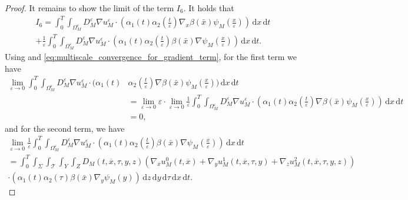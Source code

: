 \documentclass[10pt,a4paper]{amsart}
\def\T{\mathcal{T}}
\newcommand{\di}[1]{\,\mathrm{d}#1}
\def\es{\varepsilon}
\def\omm{\Omega_M^\varepsilon}
\begin{document}
\begin{proof}
It remains to show the limit of the term $I_6$. It holds that
\begin{multline*}
    I_6=\int_0^T\int_{\omm}  D_M^\es  \nabla u_M^\es\cdot (\alpha_1(t)\alpha_2(\frac{t}{\es})\nabla_{ x}\beta(\bar x) \psi_M(\frac{x}{\es})) \di{x}\di{t}\\
    +\frac1\es\int_0^T\int_{\omm}  D_M^\es  \nabla u_M^\es\cdot (\alpha_1(t)\alpha_2(\frac{t}{\es})\beta(\bar x) \nabla\psi_M(\frac{x}{\es})) \di{x}\di{t}.
\end{multline*}
Using  and \eqref{eq:multiscale_convergence_for_gradient_term}, for the first term we have 
\begin{align*}
    \lim_{\es\rightarrow 0} \int_0^T\int_{\omm}  D_M^\es  \nabla u_M^\es\cdot (\alpha_1(t)&\alpha_2(\frac{t}{\es})\nabla\beta(\bar x)\psi_M(\frac{x}{\es})) \di{x}\di{t}\\
    &=\lim_{\es\rightarrow 0}\es\cdot \lim_{\es\rightarrow 0} \frac1\es \int_0^T\int_{\omm}  D_M^\es  \nabla u_M^\es\cdot (\alpha_1(t)\alpha_2(\frac{t}{\es})\nabla\beta(\bar x)\psi_M(\frac{x}{\es})) \di{x}\di{t}\\
    &= 0,
\end{align*}
and for the second term, we have 
\begin{multline*}
    \lim_{\es\rightarrow 0}\frac1\es\int_0^T\int_{\omm}  D_M^\es  \nabla u_M^\es\cdot (\alpha_1(t)\alpha_2(\frac{t}{\es})\beta(\bar x) \nabla\psi_M(\frac{x}{\es})) \di{x}\di{t}\\
    =\int_0^T\int_{\Sigma}\int_\T\int_{Y}\int_Z   D_M(t,\overline{x},\tau,y,z)
    \left( \nabla_{\overline{x}}u_M^0(t,\overline{x})+\nabla_y u_M^1(t,\overline{x},\tau,y)+\nabla_zu_M^2(t,\overline{x},\tau,y,z)\right)\\
    \cdot ( \alpha_1(t)\alpha_2(\tau)\beta(\bar x) \nabla_y\psi_M(y)) \di{z}\di{y}\di{\tau}\di{x}\di{t}.
\end{multline*}

 


\end{proof}
\end{document}
